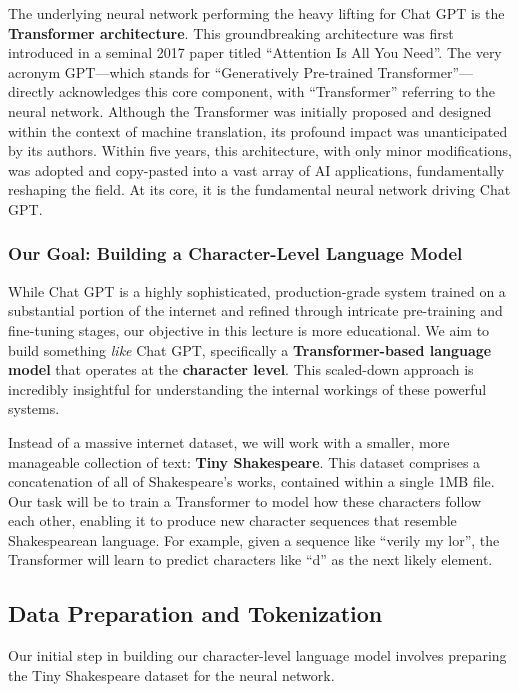 The underlying neural network performing the heavy lifting for Chat GPT is the \textbf{Transformer architecture}. This groundbreaking architecture was first introduced in a seminal 2017 paper titled ``Attention Is All You Need''. The very acronym GPT---which stands for ``Generatively Pre-trained Transformer''---directly acknowledges this core component, with ``Transformer'' referring to the neural network. Although the Transformer was initially proposed and designed within the context of machine translation, its profound impact was unanticipated by its authors. Within five years, this architecture, with only minor modifications, was adopted and copy-pasted into a vast array of AI applications, fundamentally reshaping the field. At its core, it is the fundamental neural network driving Chat GPT.

\subsubsection{Our Goal: Building a Character-Level Language Model}

While Chat GPT is a highly sophisticated, production-grade system trained on a substantial portion of the internet and refined through intricate pre-training and fine-tuning stages, our objective in this lecture is more educational. We aim to build something \textit{like} Chat GPT, specifically a \textbf{Transformer-based language model} that operates at the \textbf{character level}. This scaled-down approach is incredibly insightful for understanding the internal workings of these powerful systems.

Instead of a massive internet dataset, we will work with a smaller, more manageable collection of text: \textbf{Tiny Shakespeare}. This dataset comprises a concatenation of all of Shakespeare's works, contained within a single 1MB file. Our task will be to train a Transformer to model how these characters follow each other, enabling it to produce new character sequences that resemble Shakespearean language. For example, given a sequence like ``verily my lor'', the Transformer will learn to predict characters like ``d'' as the next likely element.

\subsection{Data Preparation and Tokenization}

Our initial step in building our character-level language model involves preparing the Tiny Shakespeare dataset for the neural network.


